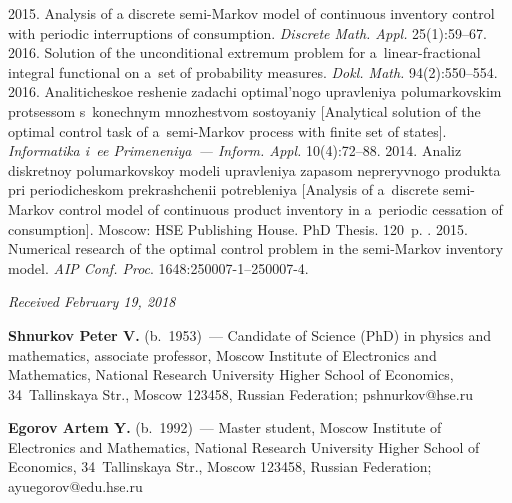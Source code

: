\begin{multicols}{2}
{{\begin{thebibliography}{99}
   2015. Analysis of a discrete  
semi-Markov model of continuous inventory control with periodic interruptions of 
consumption. \textit{Discrete Math. Appl.} 25(1):59--67.
   2016. Solution of the unconditional extremum problem for 
a~linear-fractional integral functional on a~set of probability measures. \textit{Dokl. 
Math.} 94(2):550--554.
   2016. 
Ana\-li\-ti\-che\-skoe re\-she\-nie za\-da\-chi op\-ti\-mal'\-no\-go 
uprav\-le\-niya po\-lu\-mar\-kov\-skim 
pro\-tses\-som s~ko\-nech\-nym mno\-zhest\-vom so\-sto\-yaniy 
[Analytical solution of the 
optimal control task of a~semi-Markov process with finite set of states]. 
\textit{Informatika i~ee Primeneniya~--- Inform. \mbox{Appl.}} 10(4):72--88.
   2014. Analiz dis\-kret\-noy po\-lu\-mar\-kov\-skoy mo\-de\-li 
uprav\-le\-niya za\-pa\-som ne\-pre\-ryv\-no\-go pro\-duk\-ta pri 
pe\-rio\-di\-che\-skom pre\-kra\-shche\-nii 
po\-treb\-le\-niya [Analysis of a~discrete semi-Markov control model of continuous 
product inventory in a~periodic cessation of consumption]. Moscow: HSE Publishing House.
 PhD Thesis. 120~p.
  . 2015. Numerical research of the optimal control problem in the 
semi-Markov inventory model. \textit{AIP Conf. Proc}.  
1648:250007-1--250007-4.
 \end{thebibliography}

 }
 }

\end{multicols}

\vspace*{-9pt}

\hfill{\small\textit{Received February 19, 2018}}

\vspace*{-24pt}  
  
    \Contr
    
    \vspace*{-3pt}
    
    \noindent
    \textbf{Shnurkov Peter V.} (b.\ 1953)~--- Candidate of Science (PhD) in physics 
and mathematics, associate professor, Moscow Institute of Electronics and
Mathematics, National Research University Higher 
School of Economics, 34~Tallinskaya Str., Moscow 123458, Russian Federation; 
\mbox{pshnurkov@hse.ru}
    
    
    \noindent
    \textbf{Egorov Artem Y.} (b.\ 1992)~--- Master student, Moscow Institute of Electronics and
Mathematics, National 
Research University Higher School of Economics, 34~Tallinskaya Str., Moscow 
123458, Russian Federation; \mbox{ayuegorov@edu.hse.ru}
  
    
  \label{end\stat}
  
  
  \renewcommand{\bibname}{\protect\rm Литература} 
  